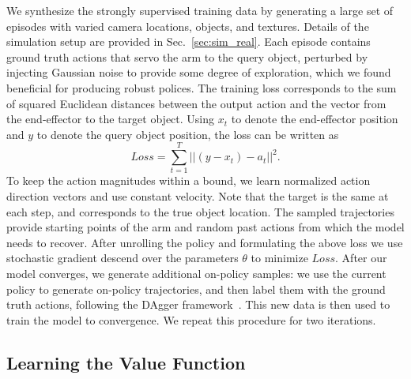 \documentclass[10pt,twocolumn,letterpaper]{article}
\begin{document}
We synthesize the strongly supervised training data by generating a large set of episodes with varied camera locations, objects, and textures. Details of the simulation setup are provided in Sec.~\ref{sec:sim_real}. Each episode contains ground truth actions that servo the arm to the query object, perturbed by injecting Gaussian noise to provide some degree of exploration, which we found beneficial for producing robust polices. The training loss corresponds to the sum of squared Euclidean distances between the output action and the vector from the end-effector to the target object. Using $x_t$ to denote the end-effector position and $y$ to denote the query object position, the loss can be written as
\begin{equation}\label{eq:loss}
    Loss = \sum_{t=1}^{T}||(y - x_{t}) - a_{t}||^2.
\end{equation}
To keep the action magnitudes within a bound, we learn normalized action direction vectors and use constant velocity. Note that the target is the same at each step, and corresponds to the true object location. The sampled trajectories provide starting points of the arm and random past actions from which the model needs to recover. After unrolling the policy and formulating the above loss we use stochastic gradient descend over the parameters $\theta$ to minimize $Loss$. After our model converges, we generate additional on-policy samples: we use the current policy to generate on-policy trajectories, and then label them with the ground truth actions, following the DAgger framework~\cite{rgb-rilsp-11}. This new data is then used to train the model to convergence. We repeat this procedure for two iterations.

\subsection{Learning the Value Function}
\end{document}
